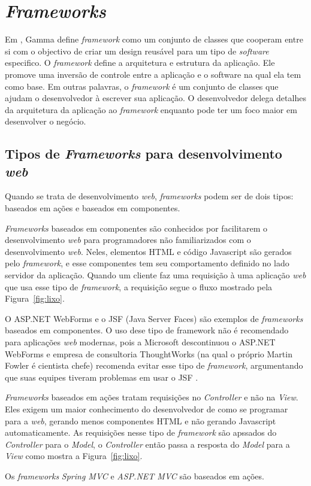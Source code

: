 \section{\textit{Frameworks}}

Em \cite{28}, Gamma define \textit{framework} como um conjunto de classes que cooperam entre si com o objectivo de criar um design reusável para um tipo de \textit{software} especifico.
O \textit{framework} define a arquitetura e estrutura da aplicação. Ele promove uma inversão de controle entre a aplicação e o software na qual ela tem como base. 
Em outras palavras, o \textit{framework} é um conjunto de classes que ajudam o desenvolvedor à escrever sua aplicação. 
O desenvolvedor delega detalhes da arquitetura da aplicação ao \textit{framework} enquanto pode ter um foco maior em desenvolver o negócio.

\subsection{Tipos de \textit{Frameworks} para desenvolvimento \textit{web}}

Quando se trata de desenvolvimento \textit{web}, \textit{frameworks} podem ser de dois tipos: baseados em ações e baseados em componentes.

\textit{Frameworks} baseados em componentes são conhecidos por facilitarem o desenvolvimento \textit{web} para programadores não familiarizados com o desenvolvimento \textit{web}. 
Neles, elementos HTML e código Javascript são gerados pelo \textit{framework}, e esse componentes tem seu comportamento definido no lado servidor da aplicação.
Quando um cliente faz uma requisição à uma aplicação \textit{web} que usa esse tipo de \textit{framework}, a requisição segue o fluxo mostrado pela Figura~\ref{fig:lixo}.


O ASP.NET WebForms e o JSF (Java Server Faces) são exemplos de \textit{frameworks} baseados em componentes. O uso dese tipo de framework não é recomendado para aplicações \textit{web} modernas, 
pois a Microsoft descontinuou o ASP.NET WebForms e empresa de consultoria ThoughtWorks (na qual o próprio Martin Fowler é cientista chefe) recomenda evitar esse tipo de \textit{framework}, 
argumentando que suas equipes tiveram problemas em usar o JSF \cite{30}.

\textit{Frameworks} baseados em ações tratam requisições no \textit{Controller} e não na \textit{View}. 
Eles exigem um maior conhecimento do desenvolvedor de como se programar para a \textit{web}, gerando menos componentes HTML e não gerando Javascript automaticamente. 
As requisições nesse tipo de \textit{framework} são apssados do \textit{Controller} para o \textit{Model}, o \textit{Controller} então passa a resposta do \textit{Model} para a \textit{View} como mostra a Figura~\ref{fig:lixo}.


Os \textit{frameworks} \textit{Spring MVC} e \textit{ASP.NET MVC} são baseados em ações.

